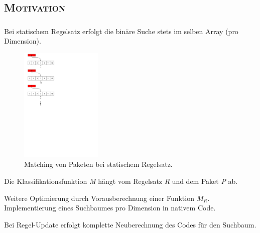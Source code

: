 \documentclass[xcolor=x11names,compress]{beamer}
\renewcommand{\(}{\begin{columns}}
\renewcommand{\)}{\end{columns}}
\newcommand{\<}[1]{\begin{column}{#1}}
\renewcommand{\>}{\end{column}}
\begin{document}
\subsection{\scshape Motivation}
\begin{frame}
  \frametitle{\insertsubsection}
  Bei statischem Regelsatz erfolgt die binäre Suche stets im selben Array (pro Dimension).\\
  \begin{figure}
  \centering
  \includegraphics[height=5.5cm]{figures/matching_process}
  \caption{Matching von Paketen bei statischem Regelsatz.}
  \end{figure}
\end{frame}

\begin{frame}
  \begin{tcolorbox}[colback=yellow!5!white,colframe=yellow!75!black,title=Erinnerung,drop fuzzy shadow]
  Die Klassifikationsfunktion \textit{M} hängt vom Regelsatz \textit{R} und dem Paket \textit{P} ab.
  \end{tcolorbox}
  \pause
  \begin{tcolorbox}[colback=blue!5!white,colframe=blue!75!black,title=Idee,drop fuzzy shadow]
  Weitere Optimierung durch Vorausberechnung einer Funktion $M_R$.\\
  Implementierung eines Suchbaumes pro Dimension in nativem Code.
  \end{tcolorbox}
  \pause
  \begin{tcolorbox}[colback=red!5!white,colframe=red!75!black,title=Nachteil,drop fuzzy shadow]
  Bei Regel-Update erfolgt komplette Neuberechnung des Codes für den Suchbaum.
  \end{tcolorbox}
\end{frame}
\end{document}
